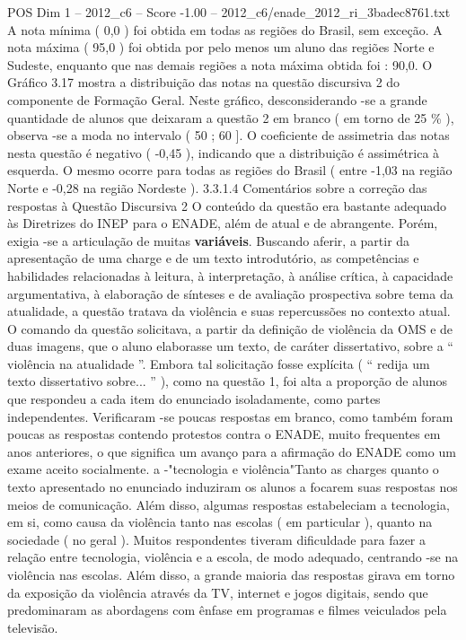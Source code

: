 \begin{textsample}{POS Dim 1 – 2012\_c6 – Score -1.00 – 2012\_c6/enade\_2012\_ri\_3badec8761.txt}
A nota mínima ( 0,0 ) foi obtida em todas as regiões do Brasil, sem exceção.
A nota máxima ( 95,0 ) foi obtida por pelo menos um aluno das regiões Norte e Sudeste, enquanto que nas demais regiões a nota máxima obtida foi : 90,0.
O Gráfico 3.17 mostra a distribuição das notas na questão discursiva 2 do componente de Formação Geral.
Neste gráfico, desconsiderando -se a grande quantidade de alunos que deixaram a questão 2 em branco ( em torno de 25 \% ), observa -se a moda no intervalo ( 50 ; 60 ].
O coeficiente de assimetria das notas nesta questão é negativo ( -0,45 ), indicando que a distribuição é assimétrica à esquerda.
O mesmo ocorre para todas as regiões do Brasil ( entre -1,03 na região Norte e -0,28 na região Nordeste ). 3.3.1.4 Comentários sobre a correção das respostas à Questão Discursiva 2 O conteúdo da questão era bastante adequado às Diretrizes do INEP para o ENADE, além de atual e de abrangente.
Porém, exigia -se a articulação de muitas \textbf{variáveis}.
Buscando aferir, a partir da apresentação de uma charge e de um texto introdutório, as competências e habilidades relacionadas à leitura, à interpretação, à análise crítica, à capacidade argumentativa, à elaboração de sínteses e de avaliação prospectiva sobre tema da atualidade, a questão tratava da violência e suas repercussões no contexto atual.
O comando da questão solicitava, a partir da definição de violência da OMS e de duas imagens, que o aluno elaborasse um texto, de caráter dissertativo, sobre a “ violência na atualidade ”.
Embora tal solicitação fosse explícita ( “ redija um texto dissertativo sobre... ” ), como na questão 1, foi alta a proporção de alunos que respondeu a cada item do enunciado isoladamente, como partes independentes.
Verificaram -se poucas respostas em branco, como também foram poucas as respostas contendo protestos contra o ENADE, muito frequentes em anos anteriores, o que significa um avanço para a afirmação do ENADE como um exame aceito socialmente. a -"tecnologia e violência"Tanto as charges quanto o texto apresentado no enunciado induziram os alunos a focarem suas respostas nos meios de comunicação.
Além disso, algumas respostas estabeleciam a tecnologia, em si, como causa da violência tanto nas escolas ( em particular ), quanto na sociedade ( no geral ).
Muitos respondentes tiveram dificuldade para fazer a relação entre tecnologia, violência e a escola, de modo adequado, centrando -se na violência nas escolas.
Além disso, a grande maioria das respostas girava em torno da exposição da violência através da TV, internet e jogos digitais, sendo que predominaram as abordagens com ênfase em programas e filmes veiculados pela televisão.

\end{textsample}
